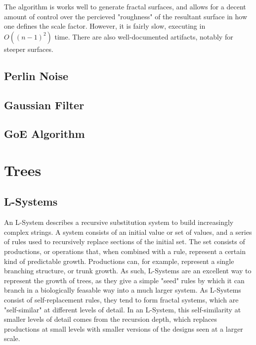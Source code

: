 \documentclass{article}
\newcommand{\tab}{\hspace*{2em}}
\begin{document}

    \tab The algorithm is works well to generate fractal surfaces, and allows for a decent amount
of control over the percieved "roughness" of the resultant surface in how one defines the scale
factor. However, it is fairly slow, executing in $O((n-1)^2)$ time. There are also well-documented
artifacts, notably for steeper surfaces.

        \subsection{Perlin Noise}

        \subsection{Gaussian Filter}

        \subsection{GoE Algorithm}

    \section{Trees}
        \subsection{L-Systems}
    \tab An L-System describes a recursive substitution system to build increasingly complex
strings. A system consists of an initial value or set of values, and a series of rules used to
recursively replace sections of the initial set. The set consists of productions, or operations
that, when combined with a rule, represent a certain kind of predictable growth. Productions can,
for example, represent a single branching structure, or trunk growth. As such, L-Systems are an
excellent way to represent the growth of trees, as they give a simple "seed" rules by which it can
branch in a biologically feasable way into a much larger system. As L-Systems consist of
self-replacement rules, they tend to form fractal systems, which are "self-similar" at different
levels of detail. In an L-System, this self-similarity at smaller levels of detail comes from the
recursion depth, which replaces productions at small levels with smaller versions of the designs
seen at a larger scale.
\end{document}
